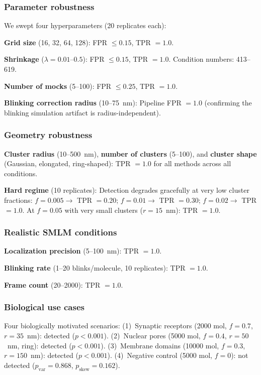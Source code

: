 \documentclass[11pt]{article}
\begin{document}
\subsubsection{Parameter robustness}
\label{sec:exp-c}

We swept four hyperparameters (20 replicates each):

\textbf{Grid size} (16, 32, 64, 128): FPR $\leq 0.15$, TPR $= 1.0$.

\textbf{Shrinkage} ($\lambda = 0.01$--$0.5$): FPR $\leq 0.15$,
TPR $= 1.0$. Condition numbers: 413--619.

\textbf{Number of mocks} (5--100): FPR $\leq 0.25$, TPR $= 1.0$.

\textbf{Blinking correction radius} (10--75~nm): Pipeline FPR $= 1.0$
(confirming the blinking simulation artifact is radius-independent).

\subsubsection{Geometry robustness}
\label{sec:exp-d}

\textbf{Cluster radius} (10--500~nm), \textbf{number of clusters}
(5--100), and \textbf{cluster shape} (Gaussian, elongated, ring-shaped):
TPR $= 1.0$ for all methods across all conditions.

\textbf{Hard regime} (10 replicates): Detection degrades gracefully at
very low cluster fractions: $f = 0.005 \rightarrow$ TPR $= 0.20$;
$f = 0.01 \rightarrow$ TPR $= 0.30$; $f = 0.02 \rightarrow$ TPR $= 1.0$.
At $f = 0.05$ with very small clusters ($r = 15$~nm): TPR $= 1.0$.

\subsubsection{Realistic SMLM conditions}
\label{sec:exp-e}

\textbf{Localization precision} (5--100~nm): TPR $= 1.0$.

\textbf{Blinking rate} (1--20 blinks/molecule, 10 replicates):
TPR $= 1.0$.

\textbf{Frame count} (20--2000): TPR $= 1.0$.

\subsubsection{Biological use cases}
\label{sec:exp-f}

Four biologically motivated scenarios:
(1)~Synaptic receptors (2000 mol, $f = 0.7$, $r = 35$~nm): detected
($p < 0.001$).
(2)~Nuclear pores (5000 mol, $f = 0.4$, $r = 50$~nm, ring): detected
($p < 0.001$).
(3)~Membrane domains (10000 mol, $f = 0.3$, $r = 150$~nm): detected
($p < 0.001$).
(4)~Negative control (5000 mol, $f = 0$): not detected
($p_\mathrm{var} = 0.868$, $p_\mathrm{skew} = 0.162$).
\end{document}
